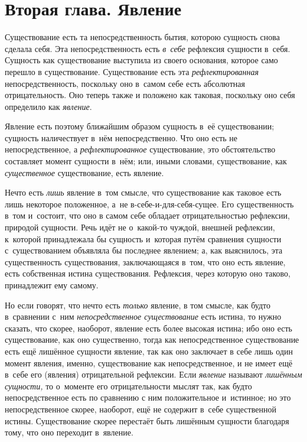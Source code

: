 \chapter[{\em Вторая глава} Явление]{Вторая глава. Явление}

Существование есть та непосредственность бытия,
которою сущность снова сделала себя. Эта непосредственность есть
{\em в~себе} рефлексия сущности в~себя. Сущность как
существование выступила из своего основания, которое само перешло в
существование. Существование есть эта
{\em рефлектированная} непосредственность, поскольку
оно в~самом себе есть абсолютная отрицательность. Оно теперь также и
положено как таковая, поскольку оно себя определило как
{\em явление}.

Явление есть поэтому ближайшим образом сущность в~её существовании; сущность
наличествует в~нём непосредственно. Что оно есть не непосредственное, а
{\em рефлектированное} существование, это
обстоятельство составляет момент сущности в~нём; или, иными словами,
существование, как {\em существенное} существование,
есть явление.

Нечто есть {\em лишь} явление в~том смысле, что
существование как таковое есть лишь некоторое положенное, а~не
в-себе-и-для-себя-сущее. Его существенность в~том и~состоит, что оно в
самом себе обладает отрицательностью рефлексии, природой сущности. Речь
идёт не о~какой-то чуждой, внешней рефлексии, к~которой принадлежала бы
сущность и~которая путём сравнения сущности с~существованием объявляла бы
последнее явлением; а, как выяснилось, эта существенность существования,
заключающаяся в~том, что оно есть явление, есть собственная истина
существования. Рефлексия, через которую оно таково, принадлежит ему самому.

Но если говорят, что нечто есть {\em только} явление, в
том смысле, как будто в~сравнении с~ним
{\em непосредственное существование} есть истина, то
нужно сказать, что скорее, наоборот, явление есть более высокая истина; ибо
оно есть существование, как оно существенно, тогда как непосредственное
существование есть ещё лишённое сущности явление, так как оно заключает в
себе лишь один момент явления, именно, существование как непосредственное,
и не имеет ещё в~себе его (явления) отрицательной рефлексии. Если
{\em явление} называют
{\em лишённым сущности,} то о~моменте его
отрицательности мыслят так, как будто непосредственное есть по сравнению с
ним положительное и~истинное; но это непосредственное скорее, наоборот, ещё
не содержит в~себе существенной истины. Существование скорее перестаёт быть
лишённым сущности благодаря тому, что оно переходит в~явление.

